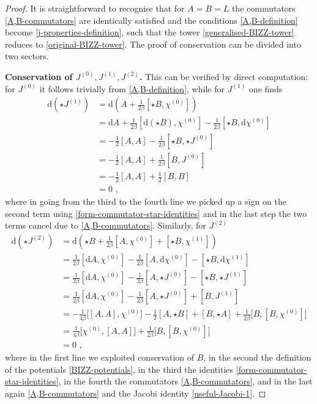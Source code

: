 \documentclass[12pt]{article}
\numberwithin{equation}{section}
\begin{document}
\begin{proof} It is straightforward to recognise that for $A=B=L$ the commutators \eqref{A,B-commutators} are identically satisfied and the conditions \eqref{A,B-definition} become \eqref{j-properties-definition}, such that the tower \eqref{generalised-BIZZ-tower} reduces to \eqref{original-BIZZ-tower}. The proof of conservation can be divided into two sectors.

\textbf{Conservation of $J^{(0)},J^{(1)},J^{(2)}$.} \qquad This can be verified by direct computation: for $J^{(0)}$ it follows trivially from \eqref{A,B-definition}, while for $J^{(1)}$ one finds 
\begin{equation}
\begin{aligned}
\mathrm{d}(\star J^{(1)})&=\mathrm{d}(A+\tfrac{1}{2\beta}[\star B,\chi^{(0)}])
\\
&=\mathrm{d}A+\tfrac{1}{2\beta}[\mathrm{d}(\star B),\chi^{(0)}]-\tfrac{1}{2\beta}[\star B,\mathrm{d}\chi^{(0)}]
\\
&=-\tfrac{1}{2}[A,A]-\tfrac{1}{2\beta}[\star B,\star J^{(0)}]
\\
&=-\tfrac{1}{2}[A,A]+\tfrac{1}{2\beta}[ B, J^{(0)}]
\\
&=-\tfrac{1}{2}[A,A]+\tfrac{1}{2}[ B, B]
\\
&=0 \,\, ,
\end{aligned}
\end{equation}
where in going from the third to the fourth line we picked up a sign on the second term using \eqref{form-commutator-star-identities} and in the last step the two terms cancel due to \eqref{A,B-commutators}. Similarly, for $J^{(2)}$ 
\begin{equation}
\begin{aligned}
\mathrm{d}(\star J^{(2)})&=\mathrm{d}(\star B+\tfrac{1}{2\beta}[A,\chi^{(0)}]+[\star B,\chi^{(1)}])
\\
&=\tfrac{1}{2\beta}[\mathrm{d}A,\chi^{(0)}]-\tfrac{1}{2\beta}[A,\mathrm{d}\chi^{(0)}]-[\star B,\mathrm{d}\chi^{(1)}]
\\
&=\tfrac{1}{2\beta}[\mathrm{d}A,\chi^{(0)}]-\tfrac{1}{2\beta}[A,\star J^{(0)}]-[\star B,\star J^{(1)}]
\\
&=\tfrac{1}{2\beta}[\mathrm{d}A,\chi^{(0)}]-\tfrac{1}{2\beta}[A,\star J^{(0)}]+[ B, J^{(1)}]
\\
&=-\tfrac{1}{4\beta}\bigl[[A,A],\chi^{(0)}\bigr]-\tfrac{1}{2}[A,\star B]+[B,\star A]+\tfrac{1}{2\beta}\bigl[B,[B,\chi^{(0)}]\bigr]
\\
&=\tfrac{1}{4\beta}\bigl[\chi^{(0)},[A,A]\bigr]+\tfrac{1}{2\beta}\bigl[B,[B,\chi^{(0)}]\bigr]
\\
&=0 \,\, ,
\end{aligned}
\end{equation}
where in the first line we exploited conservation of $B$, in the second the definition of the potentials \eqref{BIZZ-potentials}, in the third the identities \eqref{form-commutator-star-identities}, in the fourth the commutators \eqref{A,B-commutators}, and in the last again \eqref{A,B-commutators} and the Jacobi identity \eqref{useful-Jacobi-1}.



\end{proof}
\end{document}
